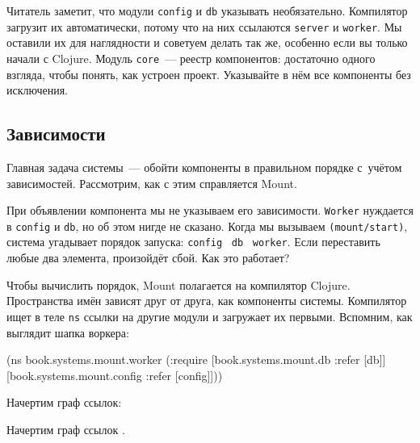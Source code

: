 Читатель заметит, что модули \verb|config| и \verb|db| указывать
необязательно. Компилятор загрузит их автоматически, потому что на них ссылаются
\verb|server| и \verb|worker|. Мы оставили их для наглядности и советуем делать
так же, особенно если вы только начали с Clojure. Модуль \verb|core|~--- реестр
компонентов: достаточно одного взгляда, чтобы понять, как устроен
проект. Указывайте в нём все компоненты без исключения.

\subsection{Зависимости}


Главная задача системы~--- обойти компоненты в правильном порядке с~учётом
зависимостей. Рассмотрим, как с этим справляется Mount.

При объявлении компонента мы не указываем его зависимости. \verb|Worker|
нуждается в \verb|config| и \verb|db|, но об этом нигде не сказано. Когда мы
вызываем \verb|(mount/start)|, система угадывает порядок запуска:
\verb|config|~\arr{} \verb|db|~\arr{} \verb|worker|. Если переставить любые два
элемента, произойдёт сбой. Как это работает?

Чтобы вычислить порядок, Mount полагается на компилятор Clojure. Пространства
имён зависят друг от друга, как компоненты системы. Компилятор ищет в теле
\verb|ns| ссылки на другие модули и загружает их первыми. Вспомним, как выглядит
шапка воркера:


\begin{english}
  \begin{clojure}
(ns book.systems.mount.worker
  (:require
   [book.systems.mount.db :refer [db]]
   [book.systems.mount.config :refer [config]]))
  \end{clojure}
\end{english}


\ifprint

\noindent
Начертим граф ссылок:

\begin{figure}[h!]
\end{figure}

\fi

\ifebook

\noindent
Начертим граф ссылок .

